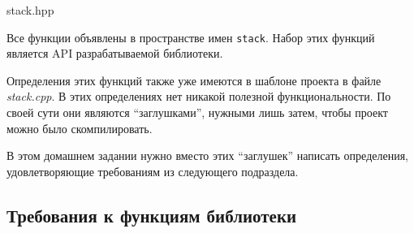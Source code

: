 \documentclass[14pt]{extarticle}
\begin{document}
            {stack.hpp}

        Все функции объявлены в пространстве имен \texttt{stack}.
        Набор этих функций является API разрабатываемой библиотеки.

        Определения этих функций также уже имеются в шаблоне проекта
        в файле \textit{stack.cpp}.
        В этих определениях нет никакой полезной функциональности.
        По своей сути они являются \enquote{заглушками}, нужными лишь затем,
        чтобы проект можно было скомпилировать.

        В этом домашнем задании нужно вместо этих \enquote{заглушек} написать
        определения, удовлетворяющие требованиям из следующего подраздела.

    \subsection{Требования к функциям библиотеки} \label{requirements}
\end{document}
